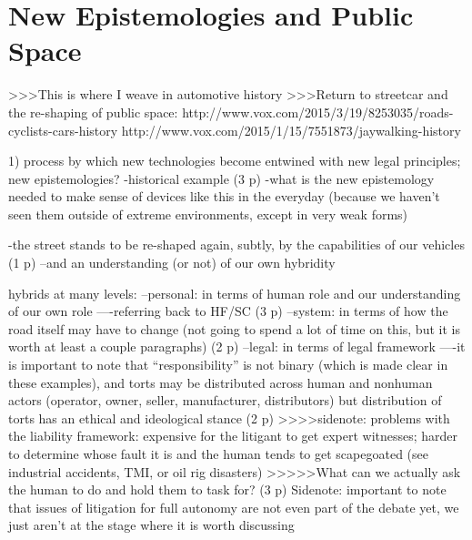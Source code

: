 \chapter{New Epistemologies and Public Space}


>>>This is where I weave in automotive history 
>>>Return to streetcar and the re-shaping of public space: 
http://www.vox.com/2015/3/19/8253035/roads-cyclists-cars-history
http://www.vox.com/2015/1/15/7551873/jaywalking-history


1) process by which new technologies become entwined with new legal
principles; new epistemologies?
-historical example (3 p)
-what is the new epistemology needed to make sense of devices like
this in the everyday (because we haven't seen them outside of extreme
environments, except in very weak forms)

-the street stands to be re-shaped again, subtly, by the capabilities
of our vehicles (1 p)
--and an understanding (or not) of our own hybridity

hybrids at many levels:
--personal: in terms of human role and our understanding of our own role
----referring back to HF/SC (3 p)
--system: in terms of how the road itself may have to change (not going to
spend a lot of time on this, but it is worth at least a couple
paragraphs) (2 p)
--legal: in terms of legal framework
----it is important to note that ``responsibility'' is not binary
(which is made clear in these examples), and torts may be distributed
across human and nonhuman actors (operator, owner, seller,
manufacturer, distributors) but distribution of torts has an ethical
and ideological stance (2 p)
>>>>sidenote: problems with the liability framework: expensive for the
litigant to get expert witnesses; harder to determine whose fault it
is and the human tends to get scapegoated (see industrial accidents,
TMI, or oil rig disasters)
>>>>>What can we actually ask the human to do and hold them to task
for? (3 p)
Sidenote: important to note that issues of litigation for full autonomy are
not even part of the debate yet, we just aren't at the stage where it
is worth discussing
